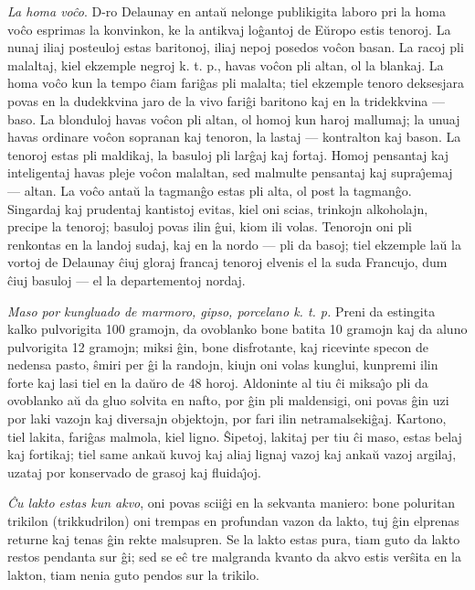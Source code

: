 \emph{La homa vo\^co}. D-ro Delaunay en anta\u u nelonge publikigita
laboro pri la homa vo\^co esprimas la konvinkon, ke la antikvaj
lo\^gantoj de E\u uropo estis tenoroj. La nunaj iliaj posteuloj
estas baritonoj, iliaj nepoj posedos vo\^con basan. La racoj pli
malaltaj, kiel ekzemple negroj k. t. p., havas vo\^con pli altan, ol
la blankaj. La homa vo\^co kun la tempo \^ciam fari\^gas pli
malalta; tiel ekzemple tenoro deksesjara povas en la dudekkvina jaro
de la vivo fari\^gi baritono kaj en la tridekkvina --- baso. La
blonduloj havas vo\^con pli altan, ol homoj kun haroj mallumaj; la
unuaj havas ordinare vo\^con sopranan kaj tenoron, la lastaj ---
kontralton kaj bason. La tenoroj estas pli maldikaj, la basuloj pli
lar\^gaj kaj fortaj. Homoj pensantaj kaj inteligentaj havas pleje
vo\^con malaltan, sed malmulte pensantaj kaj supra\^{\j}emaj ---
altan. La vo\^co anta\u u la tagman\^go estas pli alta, ol post la
tagman\^go. Singardaj kaj prudentaj kantistoj evitas, kiel oni
scias, trinkojn alkoholajn, precipe la tenoroj; basuloj povas ilin
\^gui, kiom ili volas. Tenorojn oni pli renkontas en la landoj
sudaj, kaj en la nordo --- pli da basoj; tiel ekzemple la\u u la
vortoj de Delaunay \^ciuj gloraj francaj tenoroj elvenis el la suda
Francujo, dum \^ciuj basuloj --- el la departementoj nordaj.

\emph{Maso por kungluado de marmoro, gipso, porcelano k. t. p.}
Preni da estingita kalko pulvorigita 100 gramojn, da ovoblanko bone
batita 10 gramojn kaj da aluno pulvorigita 12 gramojn; miksi \^gin,
bone disfrotante, kaj ricevinte specon de nedensa pasto, \^smiri per
\^gi la randojn, kiujn oni volas kunglui, kunpremi ilin forte kaj
lasi tiel en la da\u uro de 48 horoj. Aldoninte al tiu \^ci
miksa\^{\j}o pli da ovoblanko a\u u da gluo solvita en nafto, por
\^gin pli maldensigi, oni povas \^gin uzi por laki vazojn kaj
diversajn objektojn, por fari ilin netramalseki\^gaj. Kartono, tiel
lakita, fari\^gas malmola, kiel ligno. \^Sipetoj, lakitaj per tiu
\^ci maso, estas belaj kaj fortikaj; tiel same anka\u u kuvoj kaj
aliaj lignaj vazoj kaj anka\u u vazoj argilaj, uzataj por konservado
de grasoj kaj fluida\^{\j}oj.

\emph{\^Cu lakto estas kun akvo}, oni povas scii\^gi en la sekvanta
maniero: bone poluritan trikilon (trikkudrilon) oni trempas en
profundan vazon da lakto, tuj \^gin elprenas returne kaj tenas \^gin
rekte malsupren. Se la lakto estas pura, tiam guto da lakto restos
pendanta sur \^gi; sed se e\^c tre malgranda kvanto da akvo estis
ver\^sita en la lakton, tiam nenia guto pendos sur la trikilo.

